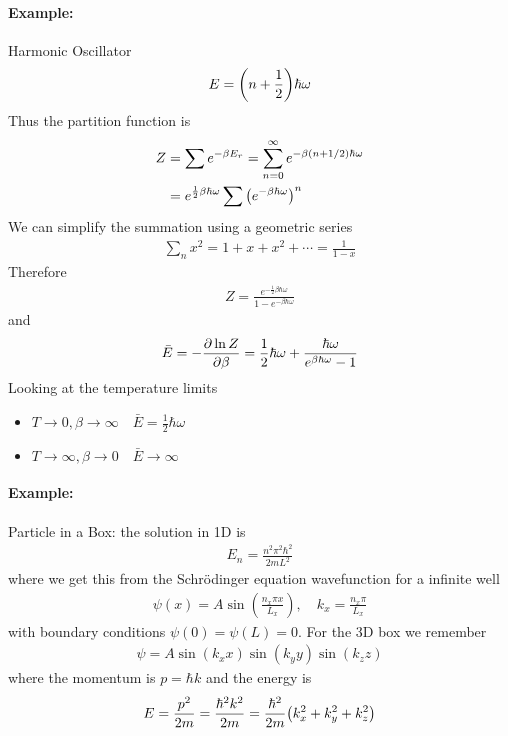 \documentclass[../main.tex]{subfiles}
\begin{document}
\paragraph{Example:} Harmonic Oscillator
\begin{align*}
    E = \qt(n + \frac{1}{2}) \hbar \omega
\end{align*}
Thus the partition function is
\begin{align*}
    Z &= \sum e^{-\beta E_r} = \sum_{n = 0}^\infty e^{-\beta (n + 1/2) \hbar \omega} \\
    &= e^{\frac{1}{2} \beta \hbar \omega} \sum \qt(
        e^{-\beta \hbar \omega}
    )^n
\end{align*}
We can simplify the summation using a geometric series
\begin{align*}
    \sum_n x^2 = 1 + x + x^2 + \cdots = \frac{1}{1 - x}
\end{align*}
Therefore
\begin{align*}
    Z = \frac{e^{-\frac{1}{2} \beta \hbar \omega}}{1 - e^{-\beta \hbar \omega}}
\end{align*}
and
\begin{align*}
    \bar E = -\pdv{\ln Z}{\beta} = \frac{1}{2} 
    \hbar \omega+ \frac{\hbar \omega}{e^{\beta \hbar \omega} - 1}
\end{align*}
Looking at the temperature limits
\begin{itemize}
    \item $T \to 0, \beta \to \infty \quad \bar E = \frac{1}{2} \hbar \omega$
    \item $T \to \infty, \beta \to 0 \quad \bar E \to \infty$
\end{itemize}

\newpage
{}

\paragraph{Example:} Particle in a Box: the solution in 1D is
\begin{align*}
    E_n = \frac{n^2 \pi^2 \hbar^2}{2mL^2}
\end{align*}
where we get this from the Schr\"odinger equation wavefunction for a infinite well
\begin{align*}
    \psi(x) = A \sin(\frac{n_x\pi x}{L_x}),\quad k_x = \frac{n_x\pi}{L_x}
\end{align*}
with boundary conditions $\psi(0) = \psi(L) = 0$. For the 3D box we remember
\begin{align*}
    \psi = A \sin(k_x x) \sin(k_y y) \sin(k_z z)
\end{align*}
where the momentum is $p = \hbar k$ and the energy is
\begin{align*}
    E = \frac{p^2}{2m} = \frac{\hbar^2 k^2}{2m} = \frac{\hbar^2}{2m} \qt(k_x^2 + k_y^2 + k_z^2)
\end{align*}
\end{document}
